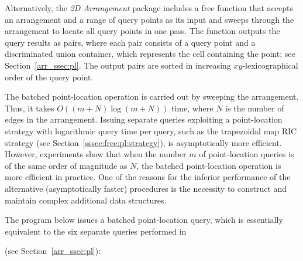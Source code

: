 Alternatively, the \emph{2D Arrangement} package includes a free
 function that accepts an arrangement and a range of
query points as its input and sweeps through the arrangement to
locate all query points in one pass. The function outputs the query
results as pairs, where each pair consists of a query point
and a discriminated union container, which represents the
cell containing the point; see Section~\ref{arr_ssec:pl}. The output
pairs are sorted in increasing $xy$-lexicographical order of the
query point.

The batched point-location operation is carried out by sweeping the
arrangement. Thus, it takes $O((m+N)\log{(m+N)})$  time, where $N$
is the number of edges in the arrangement. Issuing separate queries
exploiting a point-location strategy with logarithmic query time
per query, such as the trapezoidal map RIC strategy (see
Section~\ref{sssec:free:pl:strategy}), is asymptotically more
efficient. However, experiments show that when the number $m$ of
point-location queries is of the same order of magnitude as $N$,
the batched point-location operation is more efficient in practice. 
One of the reasons for the inferior performance of the alternative
(asymptotically faster) procedures is the necessity to construct
and maintain complex additional data structures.

The program below issues a batched point-location query, which
is essentially equivalent to the six separate queries performed in

 (see Section~\ref{arr_ssec:pl}):

